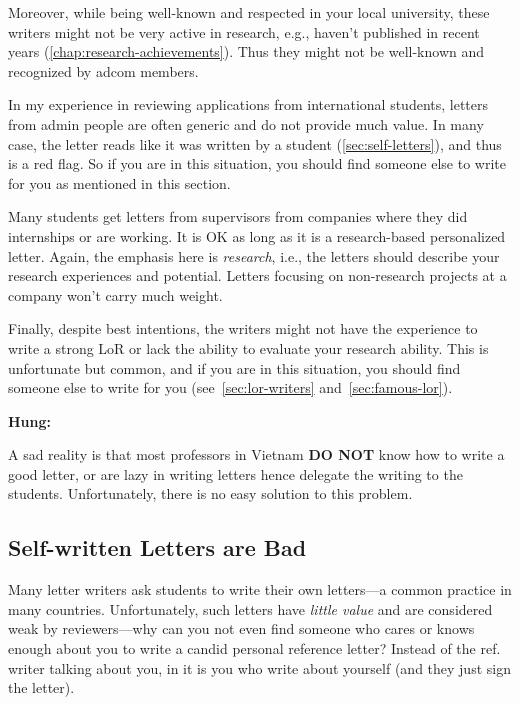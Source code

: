 \documentclass[oneside,11pt]{book}
\newenvironment{commentbox}[1][]{
  \small
  \begin{marker}[\faChessPawn{}]
    {\textbf{#1}}
  }{
  \end{marker}
}
\newenvironment{surprisebox}[1][]{
  \small
  \begin{marker}[\faChessKnight{}]
    {\textbf{#1}}
  }{
  \end{marker}
}
\begin{document}
  Moreover, while being well-known and respected in your local university, these writers might not be very active in research, e.g., haven't published in recent years (\autoref{chap:research-achievements}). Thus they might not be well-known and recognized by adcom members.  


  \begin{surprisebox}
    In my experience in reviewing applications from international students, letters from admin people are often generic and do not provide much value. 
    In many case, the letter reads like it was written by a student (\autoref{sec:self-letters}), and thus is a red flag.  So if you are in this situation, you should find someone else to write for you as mentioned in this section.
  \end{surprisebox}
  
  Many students get letters from supervisors from companies where they did internships or are working.  It is OK as long as it is a research-based personalized letter. Again, the emphasis here is \emph{research}, i.e., the letters should describe your research experiences and potential. Letters focusing on non-research projects at a company won't carry much weight.

Finally, despite best intentions, the writers might not have the experience to write a strong LoR or lack the ability to evaluate your research ability.
This is unfortunate but common, and if you are in this situation, you should find someone else to write for you (see~\autoref{sec:lor-writers} and~\autoref{sec:famous-lor}).


\begin{commentbox}[Hung:]
    A sad reality is that most professors in Vietnam \textbf{DO NOT} know how to write a good letter, or are lazy in writing letters hence delegate the writing to the students. Unfortunately, there is no easy solution to this problem.
\end{commentbox}


  
\subsection{Self-written Letters are Bad}\label{sec:self-letters}

Many letter writers ask students to write their own letters---a common practice in many countries. Unfortunately, such letters have \emph{little value} and are considered weak by reviewers---why can you not even find someone who cares or knows enough about you to write a candid personal reference letter?  Instead of the ref. writer talking about you, in it is you who write about yourself (and they just sign the letter). 
 
\end{document}
